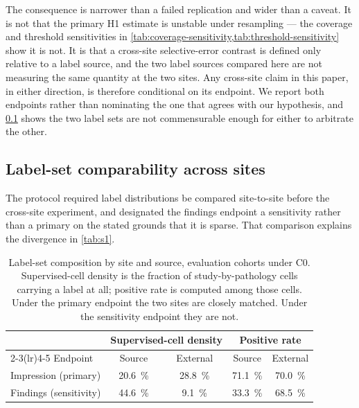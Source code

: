 The consequence is narrower than a failed replication and wider than a caveat.
It is not that the primary H1 estimate is unstable under resampling --- the
coverage and threshold sensitivities in
\cref{tab:coverage-sensitivity,tab:threshold-sensitivity} show it is not. It is
that a cross-site selective-error contrast is defined only relative to a label
source, and the two label sources compared here are not measuring the same
quantity at the two sites. Any cross-site claim in this paper, in either
direction, is therefore conditional on its endpoint. We report both endpoints
rather than nominating the one that agrees with our hypothesis, and
\cref{sec:comparability} shows the two label sets are not commensurable enough
for either to arbitrate the other.

\subsection{Label-set comparability across sites}
\label{sec:comparability}

The protocol required label distributions be compared site-to-site before the
cross-site experiment, and designated the findings endpoint a sensitivity rather
than a primary on the stated grounds that it is sparse. That comparison explains
the divergence in \cref{tab:s1}.

\begin{table}[htbp]
\centering
\caption{Label-set composition by site and source, evaluation cohorts under C0.
Supervised-cell density is the fraction of study-by-pathology cells carrying a
label at all; positive rate is computed among those cells. Under the primary
endpoint the two sites are closely matched. Under the sensitivity endpoint they
are not.}
\label{tab:comparability}
\begin{tabular}{lcccc}
\toprule
& \multicolumn{2}{c}{Supervised-cell density} & \multicolumn{2}{c}{Positive rate} \\
\cmidrule(lr){2-3}\cmidrule(lr){4-5}
Endpoint & Source & External & Source & External \\
\midrule
Impression (primary)   & \SI{20.6}{\percent} & \SI{28.8}{\percent}
                       & \SI{71.1}{\percent} & \SI{70.0}{\percent} \\
Findings (sensitivity) & \SI{44.6}{\percent} & \SI{9.1}{\percent}
                       & \SI{33.3}{\percent} & \SI{68.5}{\percent} \\
\bottomrule
\end{tabular}
\end{table}

